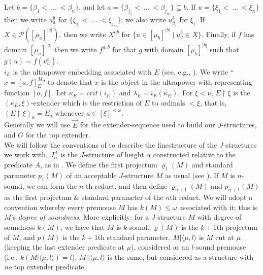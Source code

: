 \documentclass[12pt]{article}
\begin{document}
 Let $b = \{ \beta_1 < \ ... \ < \beta_n \}$, and let $a = \{ \beta_{j_1} < \ ... \ < \beta_{j_m} \} \subseteq b$.  If $u = \{ \xi_1 < \ ... \ < \xi_n \}$ then we write $u_a^b$ for $\{ \xi_{j_1} < \ ... \ < \xi_{j_m} \}$; we also write $u_{\beta_i}^b$ for $\xi_i$.  If $X \in \mathcal{P}( [ \mu_a ]^{|a|} )$, then we write $X^{ab}$ for $\{ u \in [ \mu_b ]^{|b|} \mid u_a^b \in X \} $.  Finally, if $f$ has domain $[ \mu_a ]^{|a|}$ then we write $f^{a , b}$ for that $g$ with domain $[ \mu_b ]^{|b|}$ such that $g (u) = f ( u_a^b )$.\\
 
 $i_E$ is the ultrapower embedding associated with $E$ (see, e.g., \cite{ZS finestructure}).  We write ``$x = [ a , f]_E^M$" to denote that $x$ is the object in the ultrapower with representing function $[a, f]$.  Let $\kappa_E = crit(i_E)$ and $\lambda_E = i_E(\kappa_E)$.  For $\xi < \nu$, $E \restriction \xi$ is the $( \kappa_E , \xi )$-extender which is the restriction of $E$ to ordinals $< \xi$, that is, $(E \restriction \xi )_a = E_a$ whenever $a \in [ \xi ]^{< \omega }$.\\
 
 Generally we will use $\vec{E}$ for the extender-sequence used to build our $J$-structures, and $G$ for the top extender.\\


We will follow the conventions of \cite{NITCIS} to describe the finestructure of the $J$-structures we work with.  $J_\alpha^A$ is the $J$-structure of height $\alpha$ constructed relative to the predicate $A$, as in \cite{ZS finestructure}.  We define the first projectum $\varrho_1(M)$ and standard parameter $p_1(M)$ of an acceptable $J$-structure $M$ as usual (see \cite{ZS finestructure}).  If $M$ is $n$-sound, we can form the $n$-th reduct, and then define $\varrho_{n+1}(M)$ and $p_{n+1}(M)$ as the first projectum \& standard parameter of the $n$th reduct.  We will adopt a convention whereby every premouse $M$ has $k(M) \leq \omega$ associated with it; this is $M$'s \textit{degree of soundness.}  More explicitly: for a $J$-structure $M$ with degree of soundness $k(M)$, we have that $M$ is $k$-sound, $\varrho(M)$ is the $k+1$th projectum of $M$, and $p(M)$ is the $k+1$th standard parameter.  $M | \langle \mu , l \rangle $ is $M$ cut at $\mu$ (keeping the last extender predicate at $\mu$), considered as an $l$-sound premouse (i.e., $k(M | \langle \mu , l \rangle ) = l$).  $M || \langle \mu , l \rangle$ is the same, but considered as a structure with \textit{no} top extender predicate.\\
\end{document}
